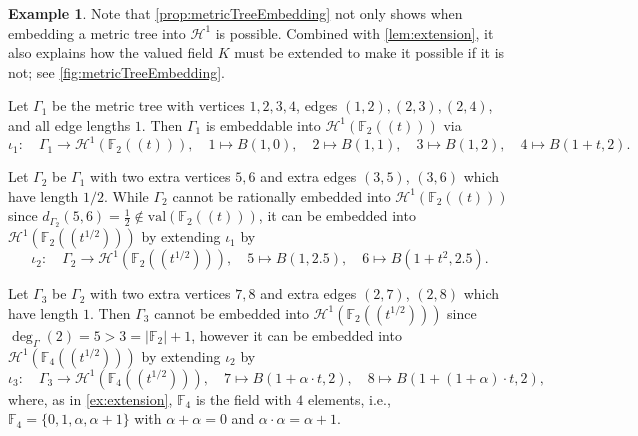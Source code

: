 \documentclass[10pt]{article}
\theoremstyle{definition}
\newtheorem{example}[theorem]{Example}
\newcommand{\FF}{\mathbb{F}}
\newcommand{\val}{{\mathrm{val}}}
\begin{document}
\begin{example}
  \label{ex:metricTreeEmbedding}
  Note that \cref{prop:metricTreeEmbedding} not only shows when embedding a metric tree into $\mathcal H^1$ is possible. Combined with \cref{lem:extension}, it also explains how the valued field $K$ must be extended to make it possible if it is not; see \cref{fig:metricTreeEmbedding}.

  Let $\Gamma_1$ be the metric tree with vertices $1,2,3,4$, edges $(1,2),(2,3),(2,4)$, and all edge lengths $1$.  Then $\Gamma_1$ is embeddable into $\mathcal H^1(\FF_2(\!(t)\!))$ via
  \begin{equation*}
    \iota_1\colon \quad \Gamma_1\rightarrow \mathcal H^1(\FF_2(\!(t)\!)), \quad 1\mapsto B(1,0), \quad 2\mapsto B(1,1), \quad 3\mapsto B(1,2), \quad 4\mapsto B(1+t,2).
  \end{equation*}

  Let $\Gamma_2$ be $\Gamma_1$ with two extra vertices $5,6$ and extra edges $(3,5)$, $(3,6)$ which have length $1/2$.  While $\Gamma_2$ cannot be rationally embedded into $\mathcal H^1(\FF_2(\!(t)\!))$ since $d_{\Gamma_2}(5,6)=\frac 12\notin \val(\FF_2(\!(t)\!))$, it can be embedded into $\mathcal H^1(\FF_2(\!(t^{1/2})\!))$ by extending $\iota_1$ by
  \begin{equation*}
    \iota_2\colon \quad \Gamma_2\rightarrow \mathcal H^1(\FF_2(\!(t^{1/2})\!)), \quad 5\mapsto B(1,2.5), \quad 6\mapsto B(1+t^2,2.5).
  \end{equation*}

  Let $\Gamma_3$ be $\Gamma_2$ with two extra vertices $7,8$ and extra edges $(2,7)$, $(2,8)$ which have length $1$.  Then $\Gamma_3$ cannot be embedded into $\mathcal H^1(\FF_2(\!(t^{1/2})\!))$ since $\deg_{\Gamma}(2)=5>3=|\FF_2|+1$, however it can be embedded into $\mathcal H^1(\FF_4(\!(t^{1/2})\!))$ by extending $\iota_2$ by
  \begin{equation*}
    \iota_3\colon \quad \Gamma_3\rightarrow \mathcal H^1(\FF_4(\!(t^{1/2})\!)), \quad 7\mapsto B(1+\alpha\cdot t,2), \quad 8\mapsto B(1+(1+\alpha)\cdot t,2),
  \end{equation*}
  where, as in \cref{ex:extension}, $\FF_4$ is the field with $4$ elements, i.e., $\FF_4=\{0,1,\alpha,\alpha+1\}$ with $\alpha+\alpha=0$ and $\alpha\cdot\alpha=\alpha+1$.
\end{example}
\end{document}
